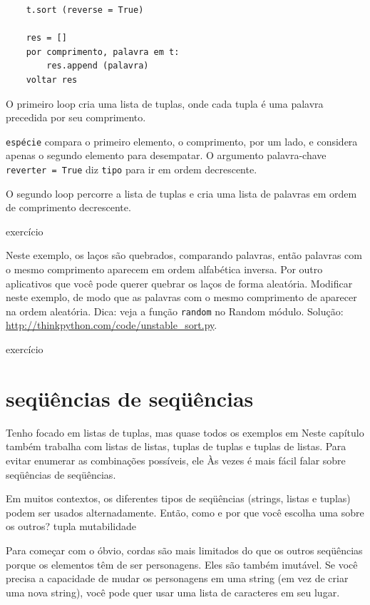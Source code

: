 \documentclass[10pt]{book}
\begin{document}
\begin{v erbatim}
\begin{verbatim}
    t.sort (reverse = True)

    res = []
    por comprimento, palavra em t:
        res.append (palavra)
    voltar res
\end{verbatim}
%
O primeiro loop cria uma lista de tuplas, onde cada
tupla é uma palavra precedida por seu comprimento.

{\tt espécie} compara o primeiro elemento, o comprimento, por um lado, e
considera apenas o segundo elemento para desempatar. O argumento palavra-chave
{\tt reverter = True} diz {\tt tipo} para ir em ordem decrescente.

O segundo loop percorre a lista de tuplas e cria uma lista de
palavras em ordem de comprimento decrescente.

\begin{} exercício

Neste exemplo, os laços são quebrados, comparando palavras, então palavras
com o mesmo comprimento aparecem em ordem alfabética inversa. Por outro
aplicativos que você pode querer quebrar os laços de forma aleatória. Modificar
neste exemplo, de modo que as palavras com o mesmo comprimento de aparecer na
ordem aleatória. Dica: veja a função {\tt random} no
{Random \tt} módulo.
Solução: \url{http://thinkpython.com/code/unstable_sort.py}.


\end{} exercício


\section{seqüências de seqüências}

Tenho focado em listas de tuplas, mas quase todos os exemplos em
Neste capítulo também trabalha com listas de listas, tuplas de tuplas e
tuplas de listas. Para evitar enumerar as combinações possíveis, ele
Às vezes é mais fácil falar sobre seqüências de seqüências.

Em muitos contextos, os diferentes tipos de seqüências (strings, listas e
tuplas) podem ser usados ​​alternadamente. Então, como e por que você escolha uma
sobre os outros?
\index{} tupla
\index{} mutabilidade

Para começar com o óbvio, cordas são mais limitados do que os outros
seqüências porque os elementos têm de ser personagens. Eles são
também imutável. Se você precisa a capacidade de mudar os personagens
em uma string (em vez de criar uma nova string), você pode
quer usar uma lista de caracteres em seu lugar.


\end{v erbatim}
\end{document}
